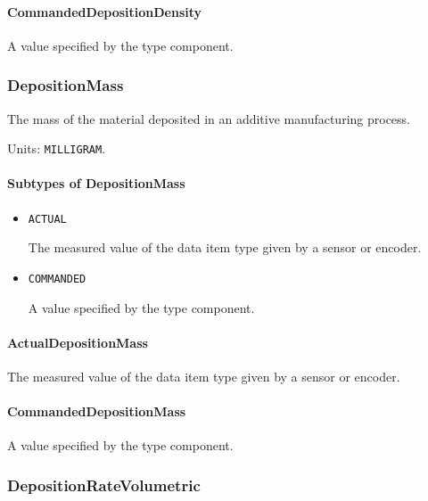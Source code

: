 \paragraph{CommandedDepositionDensity}\mbox{}
\label{sec:CommandedDepositionDensity}


A value specified by the  type component.


\subsubsection{DepositionMass}
\label{sec:DepositionMass}



The mass of the material deposited in an additive manufacturing process.


Units: \texttt{MILLIGRAM}.

\paragraph{Subtypes of DepositionMass}\mbox{}
\label{sec:Subtypes of DepositionMass}

\begin{itemize}

\item \texttt{ACTUAL}


The measured value of the data item type given by a sensor or encoder.

\item \texttt{COMMANDED}


A value specified by the  type component.


\end{itemize}

\paragraph{ActualDepositionMass}\mbox{}
\label{sec:ActualDepositionMass}


The measured value of the data item type given by a sensor or encoder.


\paragraph{CommandedDepositionMass}\mbox{}
\label{sec:CommandedDepositionMass}


A value specified by the  type component.


\subsubsection{DepositionRateVolumetric}
\label{sec:DepositionRateVolumetric}



